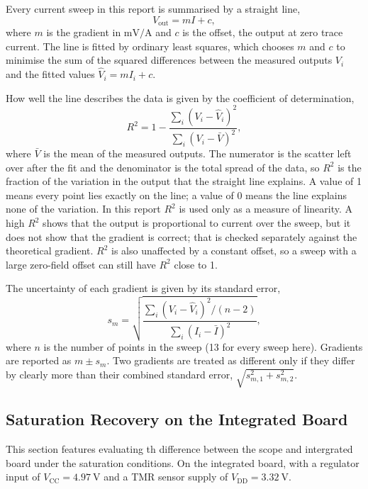 \documentclass[12pt,a4paper]{article}
\begin{document}
Every current sweep in this report is summarised by a straight line,
\begin{equation}
V_{\text{out}} = m I + c,
\label{eq:linfit}
\end{equation}
where $m$ is the gradient in $\si{\milli\volt\per\ampere}$ and $c$ is the offset, the output at zero trace current. The line is fitted by ordinary least squares, which chooses $m$ and $c$ to minimise the sum of the squared differences between the measured outputs $V_i$ and the fitted values $\hat{V}_i = m I_i + c$.
 
How well the line describes the data is given by the coefficient of determination,
\begin{equation}
R^2 = 1 - \frac{\sum_i (V_i - \hat{V}_i)^2}{\sum_i (V_i - \bar{V})^2},
\label{eq:r2}
\end{equation}
where $\bar{V}$ is the mean of the measured outputs. The numerator is the scatter left over after the fit and the denominator is the total spread of the data, so $R^2$ is the fraction of the variation in the output that the straight line explains. A value of 1 means every point lies exactly on the line; a value of 0 means the line explains none of the variation. In this report $R^2$ is used only as a measure of linearity. A high $R^2$ shows that the output is proportional to current over the sweep, but it does not show that the gradient is correct; that is checked separately against the theoretical gradient. $R^2$ is also unaffected by a constant offset, so a sweep with a large zero-field offset can still have $R^2$ close to 1.
 
The uncertainty of each gradient is given by its standard error,
\begin{equation}
s_m = \sqrt{\frac{\sum_i (V_i - \hat{V}_i)^2 / (n-2)}{\sum_i (I_i - \bar{I})^2}},
\label{eq:slope-se}
\end{equation}
where $n$ is the number of points in the sweep (13 for every sweep here). Gradients are reported as $m \pm s_m$. Two gradients are treated as different only if they differ by clearly more than their combined standard error, $\sqrt{s_{m,1}^2 + s_{m,2}^2}$.

\subsection{Saturation Recovery on the Integrated Board}
\label{sec:sat-recovery-integrated}

This section features evaluating th difference between the scope and intergrated board under the saturation conditions. On the integrated board, with a regulator input of $V_{\text{CC}} = \SI{4.97}{\volt}$ and a TMR sensor supply of $V_{\text{DD}} = \SI{3.32}{\volt}$. 
\end{document}

